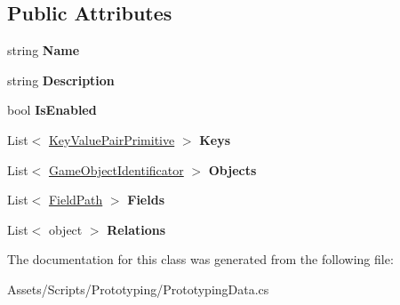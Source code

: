 \subsection*{Public Attributes}
\begin{DoxyCompactItemize}
\item 
\hypertarget{class_hattori_game2_1_1_prototyping_1_1_prototype_data_a516003b06d0fc45830021db7de22068a}{}string {\bfseries Name}\label{class_hattori_game2_1_1_prototyping_1_1_prototype_data_a516003b06d0fc45830021db7de22068a}

\item 
\hypertarget{class_hattori_game2_1_1_prototyping_1_1_prototype_data_a8c0f6d49d474ae24964f25064fa90d5d}{}string {\bfseries Description}\label{class_hattori_game2_1_1_prototyping_1_1_prototype_data_a8c0f6d49d474ae24964f25064fa90d5d}

\item 
\hypertarget{class_hattori_game2_1_1_prototyping_1_1_prototype_data_a84c70c2b7ccac5ccb9ec1ba50084f9fb}{}bool {\bfseries Is\+Enabled}\label{class_hattori_game2_1_1_prototyping_1_1_prototype_data_a84c70c2b7ccac5ccb9ec1ba50084f9fb}

\item 
\hypertarget{class_hattori_game2_1_1_prototyping_1_1_prototype_data_adeb9b7b2375419356a996c8650d76c1c}{}List$<$ \hyperlink{struct_hattori_game2_1_1_core_1_1_key_value_pair_primitive}{Key\+Value\+Pair\+Primitive} $>$ {\bfseries Keys}\label{class_hattori_game2_1_1_prototyping_1_1_prototype_data_adeb9b7b2375419356a996c8650d76c1c}

\item 
\hypertarget{class_hattori_game2_1_1_prototyping_1_1_prototype_data_ad41d44ad2fdeaca9288581c3642f6efa}{}List$<$ \hyperlink{struct_hattori_game2_1_1_core_1_1_game_object_identificator}{Game\+Object\+Identificator} $>$ {\bfseries Objects}\label{class_hattori_game2_1_1_prototyping_1_1_prototype_data_ad41d44ad2fdeaca9288581c3642f6efa}

\item 
\hypertarget{class_hattori_game2_1_1_prototyping_1_1_prototype_data_af0ff4fa301c4c5f71805396bafab60f7}{}List$<$ \hyperlink{struct_hattori_game2_1_1_core_1_1_field_path}{Field\+Path} $>$ {\bfseries Fields}\label{class_hattori_game2_1_1_prototyping_1_1_prototype_data_af0ff4fa301c4c5f71805396bafab60f7}

\item 
\hypertarget{class_hattori_game2_1_1_prototyping_1_1_prototype_data_a2f3123bd460a8c7c2341bf58dcb5cf37}{}List$<$ object $>$ {\bfseries Relations}\label{class_hattori_game2_1_1_prototyping_1_1_prototype_data_a2f3123bd460a8c7c2341bf58dcb5cf37}

\end{DoxyCompactItemize}


The documentation for this class was generated from the following file\+:\begin{DoxyCompactItemize}
\item 
Assets/\+Scripts/\+Prototyping/Prototyping\+Data.\+cs\end{DoxyCompactItemize}
